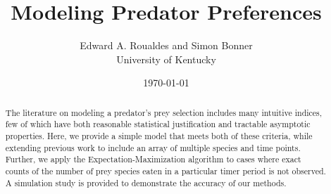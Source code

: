 \documentclass[12pt]{article}
\begin{document}
\title{Modeling Predator Preferences}
\author{Edward A. Roualdes and Simon Bonner \\ University of Kentucky}
\date{\today}
\maketitle

\begin{abstract}
The literature on modeling a predator's prey selection includes many intuitive indices, few of which have both reasonable statistical justification and tractable asymptotic properties.  Here, we provide a simple model that meets both of these criteria, while extending previous work to include an array of multiple species and time points.  Further, we apply the Expectation-Maximization algorithm to cases where exact counts of the number of prey species eaten in a particular timer period is not observed.  A simulation study is provided to demonstrate the accuracy of our methods.
\end{abstract}









\end{document}
